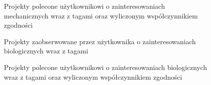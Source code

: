 \begin{figure}[h!]
	\caption{Projekty polecone użytkownikowi o zainteresowaniach mechanicznych wraz z tagami oraz wyliczonym współczynnikiem zgodności}
	\centering
\end{figure}





\begin{figure}[h!]
	\caption{Projekty zaobserwowane przez użytkownika o zainteresowaniach biologicznych wraz z tagami}
	\centering
\end{figure}

\begin{figure}[h!]
	\caption{Projekty polecone użytkownikowi o zainteresowaniach biologicznych wraz z tagami oraz wyliczonym współczynnikiem zgodności}
	\centering
\end{figure}
